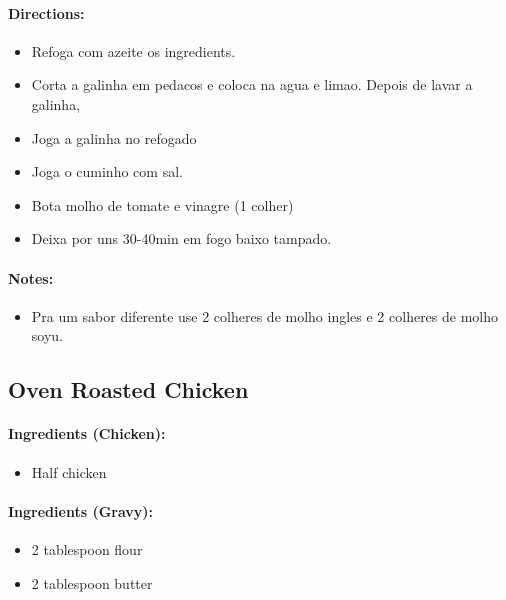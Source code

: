 \documentclass{article}
\begin{document}
\paragraph{Directions:}
\begin{itemize}
    \item Refoga com azeite os ingredients.
    \item Corta a galinha em pedacos e coloca na agua e limao. Depois de lavar a galinha,
    \item Joga a galinha no refogado
    \item Joga o cuminho com sal.
    \item Bota molho de tomate e vinagre (1 colher)
    \item Deixa por uns 30-40min em fogo baixo tampado.
\end{itemize}

\paragraph{Notes:}
\begin{itemize}
    \item Pra um sabor diferente use 2 colheres de molho ingles e 2 colheres de molho soyu.
\end{itemize}

\subsection{Oven Roasted Chicken} 

\paragraph{Ingredients (Chicken):}
\begin{itemize}
    \item Half chicken
\end{itemize}  

\paragraph{Ingredients (Gravy):}
\begin{itemize}
    \item 2 tablespoon flour
    \item 2 tablespoon butter
\end{itemize}  
\end{document}

